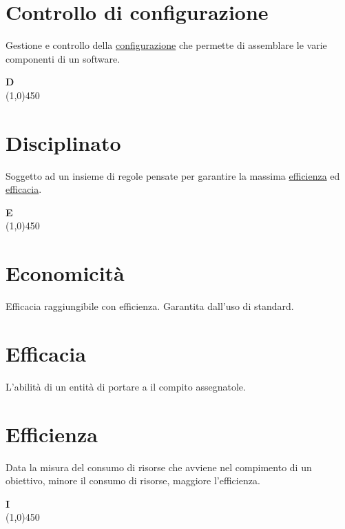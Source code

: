 	\section{Controllo di configurazione}
	\label{sec:controlloconfigurazione}
	Gestione e controllo della \hyperref[sec:configurazione]{configurazione} che permette di assemblare le varie componenti di un software.\newpage

	{\Huge{\textbf{D}}} \\
	\line(1,0){450}

	\section{Disciplinato}
	\label{sec:disciplinato}
	Soggetto ad un insieme di regole pensate per garantire la massima \hyperref[sec:efficienza]{efficienza} ed \hyperref[sec:efficacia]{efficacia}.\newpage

	{\Huge{\textbf{E}}} \\
	\line(1,0){450}

	\section{Economicità}
	\label{sec:economicita}
	Efficacia raggiungibile con efficienza. Garantita dall'uso di standard.
	
	\section{Efficacia}
	\label{sec:efficacia}
	L'abilità di un entità di portare a il compito assegnatole.
	
	\section{Efficienza}
	\label{sec:efficienza}
	Data la misura del consumo di risorse che avviene nel compimento di un obiettivo, minore il consumo di risorse, maggiore l'efficienza.\newpage

	{\Huge{\textbf{I}}} \\
	\line(1,0){450}

